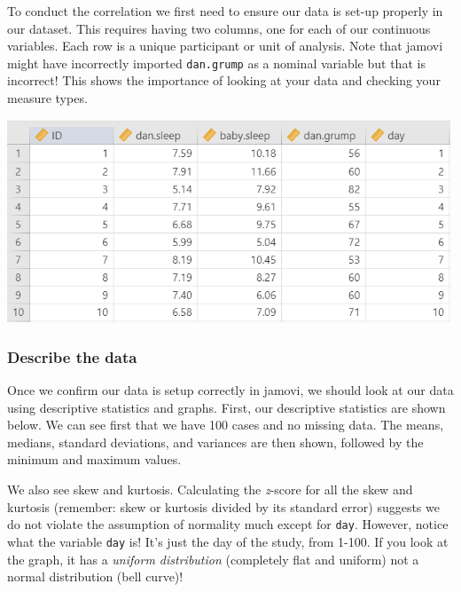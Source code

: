 \documentclass[
]{book}
\begin{document}
To conduct the correlation we first need to ensure our data is set-up properly in our dataset. This requires having two columns, one for each of our continuous variables. Each row is a unique participant or unit of analysis. Note that jamovi might have incorrectly imported \texttt{dan.grump} as a nominal variable but that is incorrect! This shows the importance of looking at your data and checking your measure types.

\includegraphics[width=5.20833in,height=\textheight]{images/08-correlation/correlation-data.png}

\hypertarget{describe-the-data-6}{%
\subsubsection{Describe the data}\label{describe-the-data-6}}

Once we confirm our data is setup correctly in jamovi, we should look at our data using descriptive statistics and graphs. First, our descriptive statistics are shown below. We can see first that we have 100 cases and no missing data. The means, medians, standard deviations, and variances are then shown, followed by the minimum and maximum values.

We also see skew and kurtosis. Calculating the \emph{z}-score for all the skew and kurtosis (remember: skew or kurtosis divided by its standard error) suggests we do not violate the assumption of normality much except for \texttt{day}. However, notice what the variable \texttt{day} is! It's just the day of the study, from 1-100. If you look at the graph, it has a \emph{uniform distribution} (completely flat and uniform) not a normal distribution (bell curve)!
\end{document}
